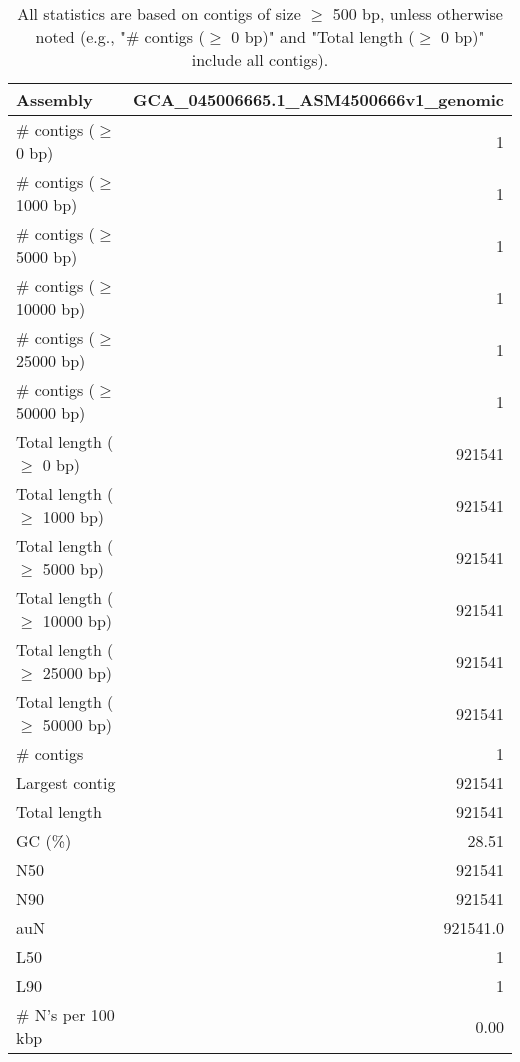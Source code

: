 \documentclass[12pt,a4paper]{article}
\begin{document}
\begin{table}[ht]
\begin{center}
\caption{All statistics are based on contigs of size $\geq$ 500 bp, unless otherwise noted (e.g., "\# contigs ($\geq$ 0 bp)" and "Total length ($\geq$ 0 bp)" include all contigs).}
\begin{tabular}{|l*{1}{|r}|}
\hline
Assembly & GCA\_045006665.1\_ASM4500666v1\_genomic \\ \hline
\# contigs ($\geq$ 0 bp) & 1 \\ \hline
\# contigs ($\geq$ 1000 bp) & 1 \\ \hline
\# contigs ($\geq$ 5000 bp) & 1 \\ \hline
\# contigs ($\geq$ 10000 bp) & 1 \\ \hline
\# contigs ($\geq$ 25000 bp) & 1 \\ \hline
\# contigs ($\geq$ 50000 bp) & 1 \\ \hline
Total length ($\geq$ 0 bp) & 921541 \\ \hline
Total length ($\geq$ 1000 bp) & 921541 \\ \hline
Total length ($\geq$ 5000 bp) & 921541 \\ \hline
Total length ($\geq$ 10000 bp) & 921541 \\ \hline
Total length ($\geq$ 25000 bp) & 921541 \\ \hline
Total length ($\geq$ 50000 bp) & 921541 \\ \hline
\# contigs & 1 \\ \hline
Largest contig & 921541 \\ \hline
Total length & 921541 \\ \hline
GC (\%) & 28.51 \\ \hline
N50 & 921541 \\ \hline
N90 & 921541 \\ \hline
auN & 921541.0 \\ \hline
L50 & 1 \\ \hline
L90 & 1 \\ \hline
\# N's per 100 kbp & 0.00 \\ \hline
\end{tabular}
\end{center}
\end{table}
\end{document}
